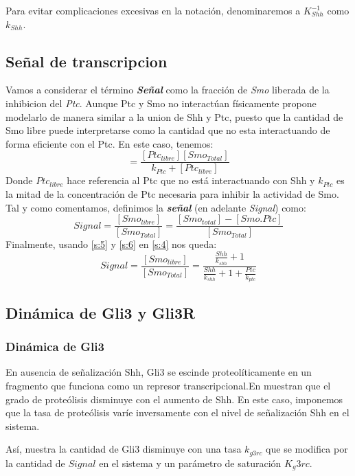  Para evitar complicaciones excesivas en la notación, denominaremos a $K_{Shh}^{-1}$ como $k_{Shh}$.
 
 \subsection{Señal de transcripcion}
 Vamos a considerar el término \textbf{\textit{Señal}} como la fracción de \textit{Smo} liberada de la inhibicion del \textit{Ptc}. Aunque Ptc y Smo no interactúan físicamente \cite{schaffer} propone modelarlo de manera similar a la union de Shh y Ptc, puesto que la cantidad de Smo libre puede interpretarse como la cantidad que no esta interactuando de forma eficiente con el Ptc.
 En este caso, tenemos:
 \begin{equation}
 [Shh.Ptc]=\frac{[Ptc_{libre}][Smo_{Total}]}{k_{Ptc}+[Ptc_{libre}]}
 \label{s:5}
 \end{equation}
 Donde $Ptc_{libre}$ hace referencia al Ptc que no está interactuando con Shh y $k_{Ptc}$ es la mitad de la concentración de Ptc necesaria para inhibir la actividad de Smo.
 Tal y como comentamos, definimos la \textbf{\textit{señal}} (en adelante \textit{Signal}) como:
 \begin{equation}
 Signal=\frac{[Smo_{libre}]}{[Smo_{Total}]}=\frac{[Smo_{total}]-[Smo.Ptc]}{[Smo_{Total}]}
 \label{s:4}
 \end{equation}
 Finalmente, usando \ref{s:5} y \ref{s:6} en \ref{s:4} nos queda:
 \begin{equation}
 Signal=\frac{[Smo_{libre}]}{[Smo_{Total}]}=\frac{\frac{Shh}{k_{shh}} + 1}{\frac{Shh}{k_{shh}} + 1 + \frac{Ptc}{k_{ptc}}}
 \label{s:7}
 \end{equation}
 
 \subsection{Dinámica de Gli3 y Gli3R}
 \subsubsection{Dinámica de Gli3}
 En ausencia de señalización Shh, Gli3 se escinde proteolíticamente en un fragmento que funciona como un
 represor transcripcional.En \cite{wang2000hedgehog} muestran que el grado de proteólisis disminuye con el aumento de Shh. En este caso, imponemos que la tasa de proteólisis varíe inversamente con el nivel de señalización Shh en el sistema.
 
 Así, nuestra la cantidad de Gli3 disminuye con una tasa $k_{g3rc}$ que se modifica por la cantidad de $Signal$ en el sistema y un parámetro de saturación $K_g3rc$.
 
